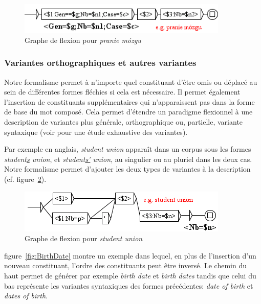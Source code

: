 \begin{figure}[!htb]
  \centering
  \includegraphics[width=10cm]{resources/img/PranieMozgu.png}
  \caption{Graphe de flexion pour \emph{pranie m\'ozgu}}
  \label{fig:PranieMozgu}
\end{figure}


\subsubsection{Variantes orthographiques et autres variantes}
Notre formalisme permet à n'importe quel constituant d'être omis ou déplacé au sein de différentes
formes fléchies si cela est nécessaire. Il permet également l'insertion de constituants
supplémentaires qui n'apparaissent pas dans la forme de base du mot composé. Cela permet d'étendre
un paradigme flexionnel à une description de variantes plus générale, orthographique ou, partielle,
variante syntaxique (voir \cite{Jacquemin01} pour une étude exhaustive des variantes).



Par exemple en anglais, 
\emph{student union} apparaît dans un corpus sous les formes \emph{student\underline{s} union}, et 
\emph{student\underline{s'} union}, au singulier ou au pluriel dans les deux cas. Notre formalisme 
permet d'ajouter les deux types de variantes à la description (cf. figure~\ref{fig:StudentUnion}).

\begin{figure}[!htb]
  \centering
  \includegraphics[width=10cm]{resources/img/StudentUnion.png}
  \caption{Graphe de flexion pour \emph{student union}}
  \label{fig:StudentUnion}
\end{figure}

\bigskip
\noindent figure~\ref{fig:BirthDate} montre un exemple dans lequel, en plus de l'insertion d'un
nouveau constituant, l'ordre des constituants peut être inversé. Le chemin du haut permet de
générer par exemple \emph{birth date} et \emph{birth dates} tandis que celui du bas représente
les variantes syntaxiques des formes précédentes: \emph{date of birth} et \emph{dates of birth}.

